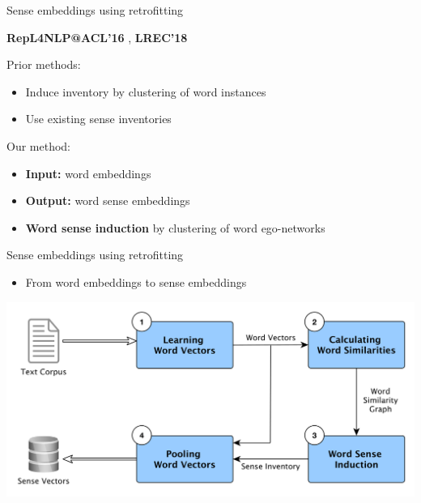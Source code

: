 \documentclass[usenames,dvipsnames]{beamer}
\begin{document}
\begin{frame}{Sense embeddings using retrofitting}
	
	 {\footnotesize \textbf{RepL4NLP@ACL'16} \cite{pelevina-EtAl:2016:RepL4NLP}, \textbf{LREC'18} \cite{remus:2018}}
	
	\begin{block}{Prior methods:}
		\vspace{0.25cm}

	\begin{itemize}	
	\item Induce inventory by \alert{clustering of word instances} %
	\item Use \alert{existing} sense inventories %
	\end{itemize}
\end{block}


	\begin{block}{Our method:}
		\vspace{0.25cm}

	\begin{itemize}	
	\item \textbf{Input:} word embeddings
	\item \textbf{Output:} word sense embeddings
	\item \textbf{Word sense induction} by \alert{clustering of word ego-networks}

	\end{itemize}
\end{block}


\end{frame}

\begin{frame}{Sense embeddings using retrofitting}
\begin{itemize}
\item From word embeddings to sense embeddings
\end{itemize}
\includegraphics[width=\textwidth]{pipeline}

\end{frame}
\end{document}

